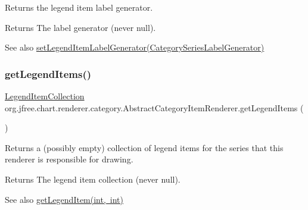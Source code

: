 Returns the legend item label generator.

\begin{DoxyReturn}{Returns}
The label generator (never {\ttfamily null}).
\end{DoxyReturn}
\begin{DoxySeeAlso}{See also}
\mbox{\hyperlink{classorg_1_1jfree_1_1chart_1_1renderer_1_1category_1_1_abstract_category_item_renderer_a59531e6a6ddc6c69540765b7d4e9a451}{set\+Legend\+Item\+Label\+Generator(\+Category\+Series\+Label\+Generator)}} 
\end{DoxySeeAlso}
\mbox{\label{classorg_1_1jfree_1_1chart_1_1renderer_1_1category_1_1_abstract_category_item_renderer_a64baac5b575af71d3dfd90791764c1a9}} 
\subsubsection{\texorpdfstring{get\+Legend\+Items()}{getLegendItems()}}
{\footnotesize\ttfamily \mbox{\hyperlink{classorg_1_1jfree_1_1chart_1_1_legend_item_collection}{Legend\+Item\+Collection}} org.\+jfree.\+chart.\+renderer.\+category.\+Abstract\+Category\+Item\+Renderer.\+get\+Legend\+Items (\begin{DoxyParamCaption}{ }\end{DoxyParamCaption})}

Returns a (possibly empty) collection of legend items for the series that this renderer is responsible for drawing.

\begin{DoxyReturn}{Returns}
The legend item collection (never {\ttfamily null}).
\end{DoxyReturn}
\begin{DoxySeeAlso}{See also}
\mbox{\hyperlink{classorg_1_1jfree_1_1chart_1_1renderer_1_1category_1_1_abstract_category_item_renderer_a7a86e8d71b7d79ed228580497ac39dca}{get\+Legend\+Item(int, int)}} 
\end{DoxySeeAlso}


